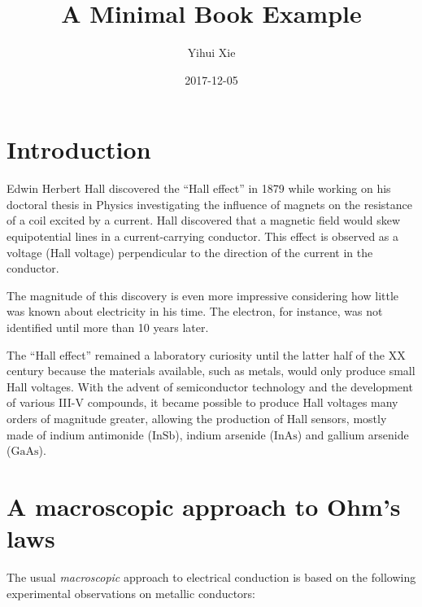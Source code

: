 \documentclass[]{book}
\title{A Minimal Book Example}
\author{Yihui Xie}
\date{2017-12-05}
\begin{document}
\maketitle

{
\setcounter{tocdepth}{1}
\tableofcontents
}
\clearpage

\chapter{Introduction}\label{introduction}

Edwin Herbert Hall discovered the ``Hall effect'' in 1879 while working
on his doctoral thesis in Physics investigating the influence of magnets
on the resistance of a coil excited by a current. Hall discovered that a
magnetic field would skew equipotential lines in a current-carrying
conductor. This effect is observed as a voltage (Hall voltage)
perpendicular to the direction of the current in the conductor.

The magnitude of this discovery is even more impressive considering how
little was known about electricity in his time. The electron, for
instance, was not identified until more than 10 years later.

The ``Hall effect'' remained a laboratory curiosity until the latter
half of the XX century because the materials available, such as metals,
would only produce small Hall voltages. With the advent of semiconductor
technology and the development of various III-V compounds, it became
possible to produce Hall voltages many orders of magnitude greater,
allowing the production of Hall sensors, mostly made of indium
antimonide (\(\mathrm{InSb}\)), indium arsenide (\(\mathrm{InAs}\)) and
gallium arsenide (\(\mathrm{GaAs}\)).

\chapter{A macroscopic approach to Ohm's
laws}\label{a-macroscopic-approach-to-ohms-laws}

The usual \emph{macroscopic} approach to electrical conduction is based
on the following experimental observations on metallic conductors:
\end{document}
